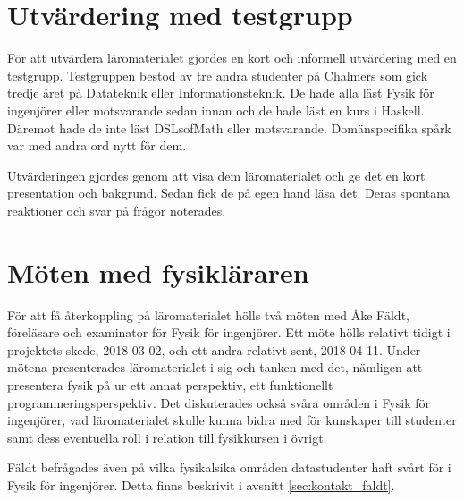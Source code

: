 \begin{draft}

\section{Utvärdering med testgrupp}


För att utvärdera läromaterialet gjordes en kort och informell utvärdering med en testgrupp. Testgruppen bestod av tre andra studenter på Chalmers som gick tredje året på Datateknik eller Informationsteknik. De hade alla läst Fysik för ingenjörer eller motsvarande sedan innan och de hade läst en kurs i Haskell. Däremot hade de inte läst DSLsofMath eller motsvarande. Domänspecifika spårk var med andra ord nytt för dem.

Utvärderingen gjordes genom att visa dem läromaterialet och ge det en kort presentation och bakgrund. Sedan fick de på egen hand läsa det. Deras spontana reaktioner och svar på frågor noterades.

\section{Möten med fysikläraren}

För att få återkoppling på läromaterialet hölls två möten med Åke Fäldt, föreläsare och examinator för Fysik för ingenjörer. Ett möte hölls relativt tidigt i projektets skede, 2018-03-02, och ett andra relativt sent, 2018-04-11. Under mötena presenterades läromaterialet i sig och tanken med det, nämligen att presentera fysik på ur ett annat perspektiv, ett funktionellt programmeringsperspektiv. Det diskuterades också svåra områden i Fysik för ingenjörer, vad läromaterialet skulle kunna bidra med för kunskaper till studenter samt dess eventuella roll i relation till fysikkursen i övrigt.

Fäldt befrågades även på vilka fysikalsika områden datastudenter haft svårt för i Fysik för ingenjörer. Detta finns beskrivit i avsnitt \ref{sec:kontakt_faldt}.

\end{draft}
























